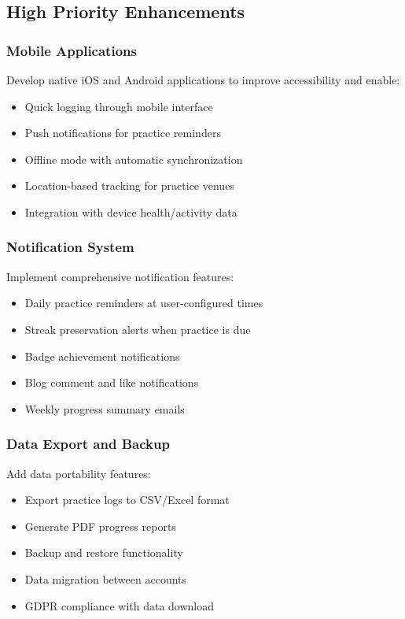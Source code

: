 \documentclass[12pt,a4paper]{report}
\newcommand{\JustifiedNormal}{\fontsize{12}{14}\selectfont\justifying\setlength{\parindent}{0pt}}
\begin{document}
\subsection{High Priority Enhancements}
\JustifiedNormal

\subsubsection{Mobile Applications}
\JustifiedNormal
Develop native iOS and Android applications to improve accessibility and enable:
\begin{itemize}
  \item Quick logging through mobile interface
  \item Push notifications for practice reminders
  \item Offline mode with automatic synchronization
  \item Location-based tracking for practice venues
  \item Integration with device health/activity data
\end{itemize}

\subsubsection{Notification System}
\JustifiedNormal
Implement comprehensive notification features:
\begin{itemize}
  \item Daily practice reminders at user-configured times
  \item Streak preservation alerts when practice is due
  \item Badge achievement notifications
  \item Blog comment and like notifications
  \item Weekly progress summary emails
\end{itemize}

\subsubsection{Data Export and Backup}
\JustifiedNormal
Add data portability features:
\begin{itemize}
  \item Export practice logs to CSV/Excel format
  \item Generate PDF progress reports
  \item Backup and restore functionality
  \item Data migration between accounts
  \item GDPR compliance with data download
\end{itemize}
\end{document}
